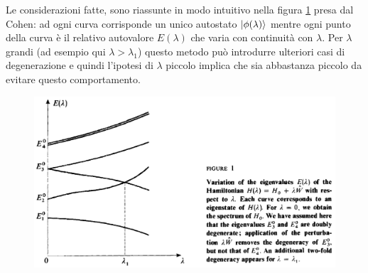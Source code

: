 \documentclass[a4paper, 10pt]{article}
\newcommand{\reff}[1]{\mbox{\ref{#1}}}
\begin{document}
Le considerazioni fatte, sono riassunte in modo intuitivo nella figura \reff{fig:fig-ipotesi} presa dal Cohen\cite{cohen}: ad ogni curva corrisponde un unico autostato $\ket{\phi(\lambda)}$ mentre ogni punto della curva è il relativo autovalore $E(\lambda)$ che varia con continuità con $\lambda$. Per $\lambda$ grandi (ad esempio qui $\lambda > \lambda_1$) questo metodo può introdurre ulteriori casi di degenerazione e quindi l'ipotesi di $\lambda$ piccolo implica che sia abbastanza piccolo da evitare questo comportamento. 
\begin{figure}
	\centering
	\includegraphics[keepaspectratio=true,scale=0.20]{imgs/ipotesi2.pdf}
	\label{fig:fig-ipotesi}
\end{figure} 
\end{document}
